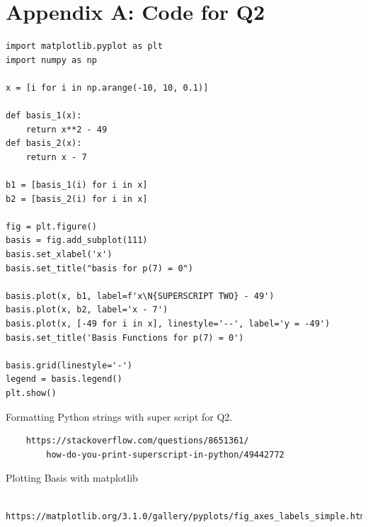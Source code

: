 \documentclass[a4paper, 11pt]{article}
\begin{document}
\newpage

\section*{Appendix A: Code for Q2}
\begin{verbatim}
import matplotlib.pyplot as plt 
import numpy as np

x = [i for i in np.arange(-10, 10, 0.1)]

def basis_1(x):
	return x**2 - 49
def basis_2(x):
	return x - 7

b1 = [basis_1(i) for i in x]
b2 = [basis_2(i) for i in x]

fig = plt.figure()
basis = fig.add_subplot(111)
basis.set_xlabel('x')
basis.set_title("basis for p(7) = 0")

basis.plot(x, b1, label=f'x\N{SUPERSCRIPT TWO} - 49')
basis.plot(x, b2, label='x - 7')
basis.plot(x, [-49 for i in x], linestyle='--', label='y = -49')
basis.set_title('Basis Functions for p(7) = 0')

basis.grid(linestyle='-')
legend = basis.legend()
plt.show()

\end{verbatim}

\newpage

\begin{thebibliography}{}
    Formatting Python strings with super script for Q2.
    \begin{verbatim}
    https://stackoverflow.com/questions/8651361/
        how-do-you-print-superscript-in-python/49442772
    \end{verbatim}
    
    Plotting Basis with matplotlib
    \begin{verbatim}
    https://matplotlib.org/3.1.0/gallery/pyplots/fig_axes_labels_simple.html
    \end{verbatim}

\end{thebibliography}{}
\end{document}
